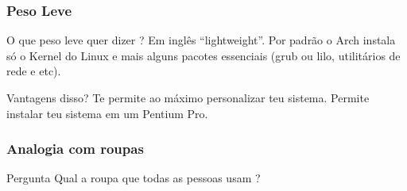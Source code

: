 \documentclass{beamer}
\begin{document}
\begin{frame}
    \frametitle{Peso Leve}
    \begin{block}{O que peso leve quer dizer ?}
        Em inglês ``lightweight''. Por padrão o Arch instala só o Kernel do Linux e mais alguns pacotes essenciais (grub ou lilo, utilitários de rede e etc).
    \end{block}

    \begin{block}{Vantagens disso?}
        Te permite ao máximo personalizar teu sistema. Permite instalar teu sistema em um Pentium Pro. 
    \end{block}
\end{frame}


\begin{frame}
    \frametitle{Analogia com roupas}
    \begin{block}{Pergunta}
            Qual a roupa que todas as pessoas usam ?

    \end{block}

\end{frame}





\end{document}
